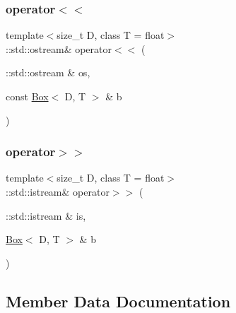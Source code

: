 \mbox{\label{classtrimesh_1_1Box_a2b5e011ce3527b8f40eb42c351bf24e9}} 
\subsubsection{\texorpdfstring{operator$<$$<$}{operator<<}}
{\footnotesize\ttfamily template$<$size\+\_\+t D, class T = float$>$ \\
\+::std\+::ostream\& operator$<$$<$ (\begin{DoxyParamCaption}\item[{\+::std\+::ostream \&}]{os,  }\item[{const \hyperlink{classtrimesh_1_1Box}{Box}$<$ D, T $>$ \&}]{b }\end{DoxyParamCaption})\hspace{0.3cm}{\ttfamily [friend]}}

\mbox{\label{classtrimesh_1_1Box_a33a4dca895ab5620960e259681995093}} 
\subsubsection{\texorpdfstring{operator$>$$>$}{operator>>}}
{\footnotesize\ttfamily template$<$size\+\_\+t D, class T = float$>$ \\
\+::std\+::istream\& operator$>$$>$ (\begin{DoxyParamCaption}\item[{\+::std\+::istream \&}]{is,  }\item[{\hyperlink{classtrimesh_1_1Box}{Box}$<$ D, T $>$ \&}]{b }\end{DoxyParamCaption})\hspace{0.3cm}{\ttfamily [friend]}}



\subsection{Member Data Documentation}
\mbox{\label{classtrimesh_1_1Box_a845e5f1648b55bd35607e9dcb09a9a92}} 
